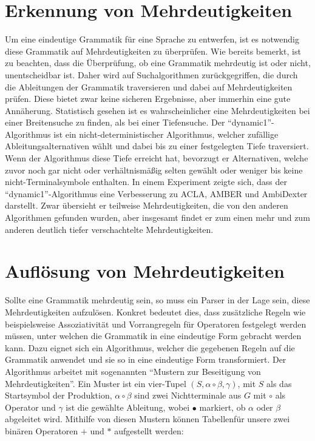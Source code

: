 \documentclass[runningheads]{llncs}
\begin{document}
    \section{Erkennung von Mehrdeutigkeiten}\label{sec:erkennung-von-mehrdeutigkeiten}

    Um eine eindeutige Grammatik für eine Sprache zu entwerfen,
    ist es notwendig diese Grammatik auf Mehrdeutigkeiten zu überprüfen.
    Wie bereits bemerkt, ist zu beachten, dass die Überprüfung, ob eine Grammatik mehrdeutig ist oder nicht,
    unentscheidbar ist.\cite{hopcroft2006introduction}
    Daher wird auf Suchalgorithmen zurückgegriffen, die durch die Ableitungen der Grammatik traversieren
    und dabei auf Mehrdeutigkeiten prüfen.
    Diese bietet zwar keine sicheren Ergebnisse, aber immerhin eine gute Annäherung.
    Statistisch gesehen ist es wahrscheinlicher eine Mehrdeutigkeiten bei einer Breitensuche zu finden,
    als bei einer Tiefensuche.\cite{springer2013}
    Der ``dynamic1''-Algorithmus\cite{springer2013} ist ein nicht-deterministischer Algorithmus, welcher zufällige \\
    Ableitungsalternativen wählt und dabei bis zu einer festgelegten Tiefe traversiert.
    Wenn der Algorithmus diese Tiefe erreicht hat, bevorzugt er Alternativen, welche zuvor noch gar nicht oder
    verhältnismäßig selten gewählt oder weniger bis keine nicht-Terminalsymbole enthalten.
    In einem Experiment\cite{springer2013} zeigte sich,
    dass der ``dynamic1''-Algorithmus eine Verbesserung zu ACLA, AMBER und AmbiDexter darstellt.
    Zwar übersieht er teilweise Mehrdeutigkeiten, die von den anderen Algorithmen gefunden wurden,
    aber insgesamt findet er zum einen mehr und zum anderen deutlich tiefer verschachtelte Mehrdeutigkeiten.


    \section{Auflösung von Mehrdeutigkeiten}\label{sec:auflosung-von-mehrdeutigkeiten}

    Sollte eine Grammatik mehrdeutig sein, so muss ein Parser in der Lage sein, diese Mehrdeutigkeiten aufzulösen.
    Konkret bedeutet dies, dass zusätzliche Regeln
    wie beispielsweise Assoziativität und Vorrangregeln für Operatoren festgelegt werden müssen,
    unter welchen die Grammatik in eine eindeutige Form gebracht werden kann.
    Dazu eignet sich ein Algorithmus\footnotemark[1], welcher die gegebenen Regeln auf die Grammatik anwendet
    und sie so in eine eindeutige Form transformiert.
    Der Algorithmus arbeitet mit sogenannten ``Mustern zur Beseitigung von Mehrdeutigkeiten''.
    Ein Muster ist ein vier-Tupel $(S, \alpha \circ \beta, \gamma)$, mit $S$ als das Startsymbol der Produktion,
    $\alpha \circ \beta$ sind zwei Nichtterminale aus $G$ mit $\circ$ als Operator und $\gamma$ ist die gewählte Ableitung,
    wobei $\bullet$ markiert, ob $\alpha$ oder $\beta$ abgeleitet wird.
    Mithilfe von diesen Mustern können Tabellen\footnotemark[2] für unsere zwei binären Operatoren $+$ und $*$ aufgestellt werden:
\end{document}

